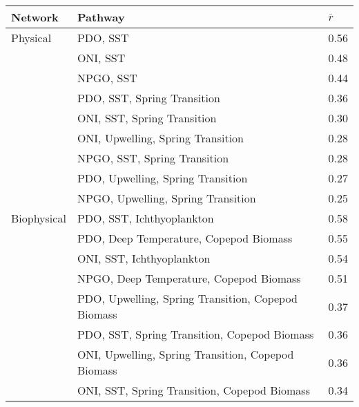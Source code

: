 \begin{tabular}{lll}
  \hline
Network & Pathway & $\overline{r}$ \\ 
  \hline
Physical & PDO, SST  & 0.56 \\ 
   & ONI, SST  & 0.48 \\ 
   & NPGO, SST  & 0.44 \\ 
   & PDO, SST, Spring Transition  & 0.36 \\ 
   & ONI, SST, Spring Transition  & 0.30 \\ 
   & ONI, Upwelling, Spring Transition  & 0.28 \\ 
   & NPGO, SST, Spring Transition  & 0.28 \\ 
   & PDO, Upwelling, Spring Transition  & 0.27 \\ 
   & NPGO, Upwelling, Spring Transition  & 0.25 \\ 
  Biophysical & PDO, SST, Ichthyoplankton  & 0.58 \\ 
   & PDO, Deep Temperature, Copepod Biomass  & 0.55 \\ 
   & ONI, SST, Ichthyoplankton  & 0.54 \\ 
   & NPGO, Deep Temperature, Copepod Biomass  & 0.51 \\ 
   & PDO, Upwelling, Spring Transition, Copepod Biomass  & 0.37 \\ 
   & PDO, SST, Spring Transition, Copepod Biomass  & 0.36 \\ 
   & ONI, Upwelling, Spring Transition, Copepod Biomass  & 0.36 \\ 
   & ONI, SST, Spring Transition, Copepod Biomass  & 0.34 \\ 
   \hline
\end{tabular}
